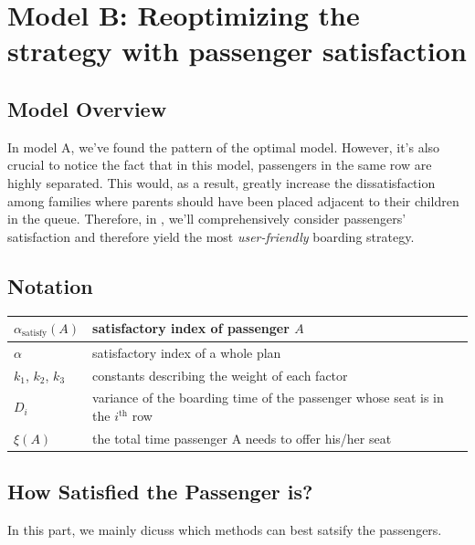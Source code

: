\documentclass{article}
\begin{document}
	\section{Model B: Reoptimizing the strategy with passenger satisfaction}
	\subsection{Model Overview}
	In model A, we've found the pattern of the optimal model. However, it's also crucial to notice the fact that in this model, passengers in the same row are highly separated. This would, as a result, greatly increase the dissatisfaction among families where parents should have been placed adjacent to their children in the queue. Therefore, in , we'll comprehensively consider passengers' satisfaction and therefore yield the most \textit{user-friendly} boarding strategy.
	\subsection{Notation}
	\begin{center}
	\begin{tabular}{|l|l|}
		\hline
		$\alpha_\text{satisfy}(A)$&satisfactory index of passenger $A$\\
		\hline
		$\alpha$&satisfactory index of a whole plan\\
		\hline
		$k_1$, $k_2$, $k_3$&constants describing the weight of each factor\\
		\hline
		$D_i$&variance of the boarding time of the passenger whose seat is in the $i^\text{th}$ row\\
		\hline
		\(\xi\left(A\right)\) & the total time passenger A needs to offer his/her seat\\
		\hline
	\end{tabular}
	\end{center}
	\subsection{How Satisfied the Passenger is?}
	In this part, we mainly dicuss which methods can best satsify the passengers.
\end{document}
